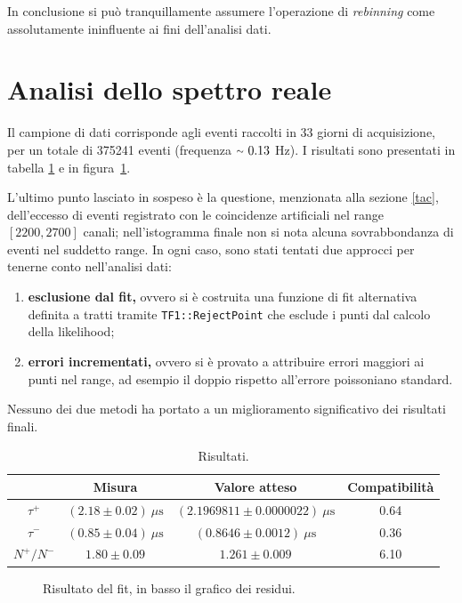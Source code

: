 \documentclass[10pt, oneside, a4paper]{article}   	%
\begin{document}
In conclusione si può tranquillamente assumere l'operazione di \textit{rebinning} come assolutamente ininfluente ai fini dell'analisi dati.
%
\section{Analisi dello spettro reale} \label{analisireale}
Il campione di dati corrisponde agli eventi raccolti in 33 giorni di acquisizione, per un totale di 375241 eventi (frequenza $ {\raise.17ex\hbox{$\scriptstyle\sim$}} \ 0.13$ Hz). I risultati sono presentati in tabella \ref{risultatiFinali} e in figura~\ref{fig:finale}.

L'ultimo punto lasciato in sospeso è la questione, menzionata alla sezione \ref{tac}, dell'eccesso di eventi registrato con le coincidenze artificiali nel range $[2200,2700]$ canali; nell'istogramma finale non si nota alcuna sovrabbondanza di eventi nel suddetto range. In ogni caso, sono stati tentati due approcci per tenerne conto nell'analisi dati:
\begin{enumerate}
  \item \textbf{esclusione dal fit,} ovvero si è costruita una funzione di fit alternativa definita a tratti tramite \lstinline{TF1::RejectPoint} che esclude i punti dal calcolo della likelihood;
  \item \textbf{errori incrementati,} ovvero si è provato a attribuire errori maggiori ai punti nel range, ad esempio il doppio rispetto all'errore poissoniano standard.
\end{enumerate}
Nessuno dei due metodi ha portato a un miglioramento significativo dei risultati finali.
%
\begin{table}[H]
	\centering
	\begin{tabular}{cccc}
		\toprule
				& Misura	& Valore atteso 	& Compatibilità \\	
		\midrule
		$\tau^+$	& $(2.18 \pm 0.02) \ \mu \mbox{s}$ 	& $(2.1969811 \pm 0.0000022) \  \mu \mbox{s}$ 	& 0.64 	\\
		$\tau^-$	& $(0.85 \pm 0.04)  \ \mu \mbox{s}$ 	& $(0.8646 \pm 0.0012)  \ \mu \mbox{s}$ 		& 0.36	\\
		$N^+/N^-$	& $1.80 \pm 0.09$ 	& $1.261 \pm 0.009$ 		& 6.10	\\
		\bottomrule
	\end{tabular}
	\caption{Risultati.}
	\label{risultatiFinali}
\end{table}
%
\begin{figure}[H]
 \centerline{%
  }
  \caption{Risultato del fit, in basso il grafico dei residui.}
  \label{fig:finale}
\end{figure}
%
\end{document}
